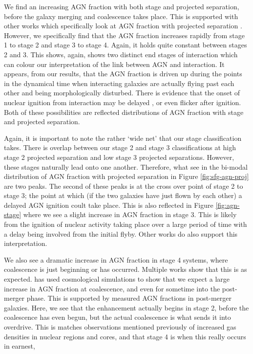 We find an increasing AGN fraction with both stage and projected separation, before the galaxy merging and coalescence takes place. This is supported with other works which specifically look at AGN fraction with projected separation \citep{2011MNRAS.418.2043E, 2023ApJ...942..107S}. However, we specifically find that the AGN fraction increases rapidly from stage 1 to stage 2 and stage 3 to stage 4. Again, it holds quite constant between stages 2 and 3. This shows, again, shows two distinct end stages of interaction which can colour our interpretation of the link between AGN and interaction. It appears, from our results, that the AGN fraction is driven up during the points in the dynamical time when interacting galaxies are actually flying past each other and being morphologically disturbed. There is evidence that the onset of nuclear ignition from interaction may be delayed \citep{2011MNRAS.418.2043E}, or even flicker \citep{2015MNRAS.451.2517S} after ignition. Both of these possibilities are reflected distributions of AGN fraction with stage and projected separation.

Again, it is important to note the rather `wide net' that our stage classification takes. There is overlap between our stage 2 and stage 3 classifications at high stage 2 projected separation and low stage 3 projected separations. However, these stages naturally lead onto one another. Therefore, what see in the bi-modal distribution of AGN fraction with projected separation in Figure \ref{fig:sfg-agn-proj} are two peaks. The second of these peaks is at the cross over point of stage 2 to stage 3; the point at which (if the two galaxies have just flown by each other) a delayed AGN ignition coult take place. This is also reflected in Figure \ref{fig:agn-stage} where we see a slight increase in AGN fraction in stage 3. This is likely from the ignition of nuclear activity taking place over a large period of time with a delay being involved from the initial flyby. Other works do also support this interpretation.

We also see a dramatic increase in AGN fraction in stage 4 systems, where coalescence is just beginning or has occurred. Multiple works show that this is as expected. \citet{2023MNRAS.519.4966B} has used cosmological simulations to show that we expect a large increase in AGN fraction at coalescence, and even for sometime into the post-merger phase. This is supported by measured AGN fractions in post-merger galaxies. Here, we see that the enhancement actually begins in stage 2, before the coalescence has even begun, but the actual coalescence is what sends it into overdrive. This is matches observations mentioned previously of increased gas densities in nuclear regions and cores, and that stage 4 is when this really occurs in earnest,

